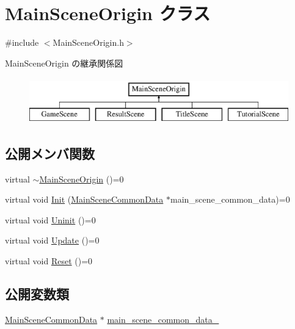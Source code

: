 \hypertarget{class_main_scene_origin}{}\section{Main\+Scene\+Origin クラス}
\label{class_main_scene_origin}


{\ttfamily \#include $<$Main\+Scene\+Origin.\+h$>$}

Main\+Scene\+Origin の継承関係図\begin{figure}[H]
\begin{center}
\leavevmode
\includegraphics[height=2.000000cm]{class_main_scene_origin}
\end{center}
\end{figure}
\subsection*{公開メンバ関数}
\begin{DoxyCompactItemize}
\item 
virtual \mbox{\hyperlink{class_main_scene_origin_af3fd8cd71354c8392040da486a538d67}{$\sim$\+Main\+Scene\+Origin}} ()=0
\item 
virtual void \mbox{\hyperlink{class_main_scene_origin_a4553bd787023f0b74a88687aee42946f}{Init}} (\mbox{\hyperlink{struct_main_scene_common_data}{Main\+Scene\+Common\+Data}} $\ast$main\+\_\+scene\+\_\+common\+\_\+data)=0
\item 
virtual void \mbox{\hyperlink{class_main_scene_origin_a36b2f5278a3adf1187d7130c66a03c08}{Uninit}} ()=0
\item 
virtual void \mbox{\hyperlink{class_main_scene_origin_aa4f54223932e0ca5f79ff11a7b87f843}{Update}} ()=0
\item 
virtual void \mbox{\hyperlink{class_main_scene_origin_a720d9daa0d45eff94ab55ef905b4aad8}{Reset}} ()=0
\end{DoxyCompactItemize}
\subsection*{公開変数類}
\begin{DoxyCompactItemize}
\item 
\mbox{\hyperlink{struct_main_scene_common_data}{Main\+Scene\+Common\+Data}} $\ast$ \mbox{\hyperlink{class_main_scene_origin_a42ad5acaa22cb93b81f76859d588e46c}{main\+\_\+scene\+\_\+common\+\_\+data\+\_\+}}
\end{DoxyCompactItemize}


